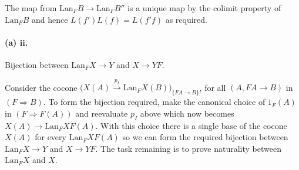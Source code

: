 \documentclass{article}
\begin{document}
The map from $\text{Lan}_FB \rightarrow \text{Lan}_FB''$ is a unique map by the colimit property of $\text{Lan}_FB$ and hence $L(f')L(f) = L(f'f)$ as required.

\paragraph{(a) ii.}
Bijection between $\text{Lan}_FX \rightarrow Y$ and $X \rightarrow Y F$.

Consider the cocone $\big(X(A) \xrightarrow{p_I} \text{Lan}_FX(B)\big)_{\{FA \rightarrow B\}}$, for all $\left(A,FA \rightarrow B\right)$ in $\left(F \Rightarrow B\right)$. To form the bijection required, make the canonical choice of $1_F(A)$ in $(F \Rightarrow F(A))$ and reevaluate $p_I$ above which now becomes $X(A) \rightarrow \text{Lan}_FXF(A)$. With this choice there is a single base of the cocone $X(A)$ for every $\text{Lan}_FXF(A)$ so we can form the required bijection between $\text{Lan}_FX \rightarrow Y$ and $X \rightarrow Y F$. The task remaining is to prove naturality between $\text{Lan}_FX$ and $X$.
\end{document}
